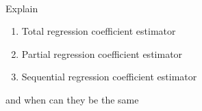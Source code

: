 \documentclass[UTF8,a4paper,10pt]{article}
\begin{document}
  \begin{solution}\,\\


  \end{solution}


  \begin{Problem}[]{}
    Explain
    \begin{enumerate}
      \item Total regression coefficient estimator
      \item Partial regression coefficient estimator
      \item Sequential regression coefficient estimator
    \end{enumerate}
    and when can they be the same
  \end{Problem} 

  \begin{solution}
    






    
  \end{solution}
\end{document}
